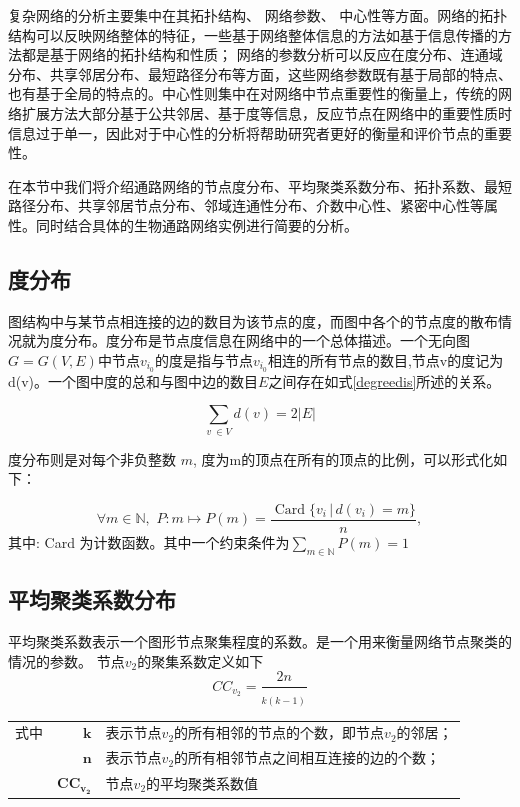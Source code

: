 复杂网络的分析主要集中在其拓扑结构、 网络参数、 中心性等方面。网络的拓扑结构可以反映网络整体的特征，一些基于网络整体信息的方法如基于信息传播的方法\cite{emig2013drug}都是基于网络的拓扑结构和性质； 网络的参数分析可以反应在度分布、连通域分布、共享邻居分布、最短路径分布等方面，这些网络参数既有基于局部的特点、也有基于全局的特点的。中心性则集中在对网络中节点重要性的衡量上，传统的网络扩展方法大部分基于公共邻居、基于度\cite{lu2011link}等信息，反应节点在网络中的重要性质时信息过于单一，因此对于中心性的分析将帮助研究者更好的衡量和评价节点的重要性。

在本节中我们将介绍通路网络的节点度分布、平均聚类系数分布、拓扑系数、最短路径分布、共享邻居节点分布、邻域连通性分布、介数中心性、紧密中心性等属性。同时结合具体的生物通路网络实例进行简要的分析。

\subsection{度分布}
图结构中与某节点相连接的边的数目为该节点的度，而图中各个的节点度的散布情况就为度分布。度分布是节点度信息在网络中的一个总体描述。一个无向图 ${\displaystyle G=G(V,E)}$中节点$ {\displaystyle v_{i_{0}}}$的度是指与节点$ {\displaystyle v_{i_{0}}}$相连的所有节点的数目,节点v的度记为d(v)。一个图中度的总和与图中边的数目$E$之间存在如式\ref{degreedis}所述的关系。

\begin{equation}\label{degreedis}
  \sum _{v\ \in V} d( v) =2|E|
\end{equation}

度分布则是对每个非负整数 ${\displaystyle m}$, 度为m的顶点在所有的顶点的比例，可以形式化如下：

\begin{equation}\label{eq23}
{\displaystyle \forall m\in \mathbb {N} ,\,\,P:m\mapsto P(m)={\frac {\operatorname {Card} \{v_{i}\,|\,d(v_{i})=m\}}{n}},}
\end{equation}
其中: Card 为计数函数。其中一个约束条件为$ {\displaystyle \sum _{m\in \mathbb {N} }P(m)=1}$

\subsection{平均聚类系数分布}
平均聚类系数表示一个图形节点聚集程度的系数。是一个用来衡量网络节点聚类的情况的参数。 节点${v_{2}}$的聚集系数定义如下
\begin{equation}\label{eq24}
CC_{v_{2}} =\frac{2n}{_{k( k-1)}}
\end{equation}
\begin{tabularx}{\textwidth}{@{}l@{\quad}r@{———}X@{}}
式中 & $\boldsymbol{k}$ &  表示节点${v_{2}}$的所有相邻的节点的个数，即节点${v_{2}}$的邻居；\\
	& $\boldsymbol{n}$ &   表示节点${v_{2}}$的所有相邻节点之间相互连接的边的个数；\\
	& $\boldsymbol{CC_{v_{2}}}$ &	节点${v_{2}}$的平均聚类系数值 \\
\end{tabularx}\vspace{3.15bp}

